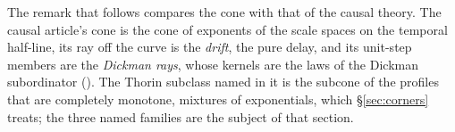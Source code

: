 The remark that follows compares the cone with that of the causal theory. The causal
article's cone is the cone of exponents of the
scale spaces on the temporal half-line, its ray off the curve is the \emph{drift}, the pure
delay, and its unit-step members are the \emph{Dickman rays}, whose kernels are the laws of
the Dickman subordinator (). The Thorin subclass named in it is
the subcone of the profiles that are completely monotone, mixtures of exponentials, which
\S\ref{sec:corners} treats; the three named families are the subject of that section.

